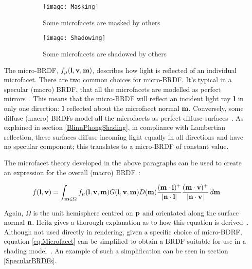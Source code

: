 \begin{figure}[h]
	\begin{subfigure}{0.48\textwidth}
		\texttt{[image: Masking]}
		\caption{Some microfacets are masked by others}
	\end{subfigure}
	\hspace*{\fill}
	\begin{subfigure}{0.48\textwidth}
		\texttt{[image: Shadowing]}
		\caption{Some microfacets are shadowed by others}
	\end{subfigure}
	\caption{}
	\label{fig:MaskingAndShadowing}
\end{figure}

The micro-BRDF, \begin{math}f_\mu(\mathbf{l}, \mathbf{v}, \mathbf{m})\end{math}, describes how light is reflected of an individual microfacet. There are two common choices for micro-BRDF. It's typical in a specular (macro) BRDF, that all the microfacets are modelled as perfect mirrors~\cite{CookTorrance}. This means that the micro-BRDF will reflect an incident light ray \begin{math}\mathbf{l}\end{math} in only one direction: \begin{math}\mathbf{l}\end{math} reflected about the microfacet normal \begin{math}\mathbf{m}\end{math}. Conversely, some diffuse (macro) BRDFs model all the microfacets as perfect diffuse surfaces~\cite{OrenAndNayar}. As explained in section \ref{BlinnPhongShading}, in compliance with Lambertian reflection, these surfaces diffuse incoming light equally in all directions and have no specular component; this translates to a micro-BRDF of constant value.

The microfacet theory developed in the above paragraphs can be used to create an expression for the overall (macro) BRDF~\cite{RTR4}:

\begin{equation} \label{eq:Microfacet}
	f(\mathbf{l}, \mathbf{v}) = \int_{\mathbf{m}\in\Omega}f_\mu(\mathbf{l}, \mathbf{v}, \mathbf{m})G(\mathbf{l}, \mathbf{v}, \mathbf{m})D(\mathbf{m})\frac{(\mathbf{m}\cdot\mathbf{l})^+}{\abs{\mathbf{n}\cdot\mathbf{l}}}\frac{(\mathbf{m}\cdot\mathbf{v})^+}{\abs{\mathbf{n}\cdot\mathbf{v}}}\,d\mathbf{m}
\end{equation}

Again, \begin{math}\Omega\end{math} is the unit hemisphere centred on \begin{math}\mathbf{p}\end{math} and orientated along the surface normal \begin{math}\mathbf{n}\end{math}. Heitz gives a thorough explanation as to how this equation is derived~\cite{HeitzMicrofacetTheory}. Although not used directly in rendering, given a specific choice of micro-BDRF, equation \ref{eq:Microfacet} can be simplified to obtain a BRDF suitable for use in a shading model~\cite{RTR4}. An example of such a simplification can be seen in section \ref{SpecularBRDFs}.

